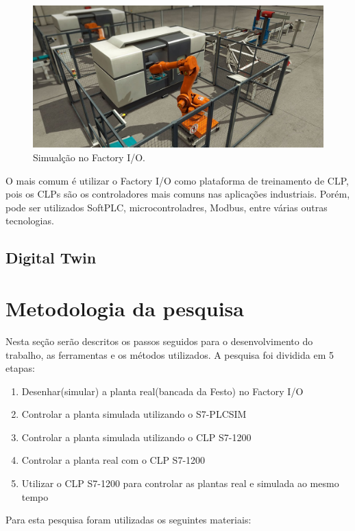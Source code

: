 \documentclass[a4paper, 12pt]{article}
\begin{document}
		\begin{figure}[H]
			\centering
			\includegraphics[scale=0.4]{figures/factory_io_1.jpg}
			\caption{Simualção no Factory I/O.}
			\label{fig:factory_simulation}
		\end{figure}
		
		O mais comum é utilizar o Factory I/O como plataforma de treinamento de CLP, pois
		os CLPs 	são os controladores mais comuns nas aplicações industriais. Porém, pode
		ser utilizados SoftPLC, microcontroladres, Modbus, entre várias outras tecnologias.
	
	\subsection{Digital Twin}

\section{Metodologia da pesquisa}
	
	Nesta seção serão descritos os passos seguidos para o desenvolvimento do trabalho,
	as ferramentas e os métodos utilizados.
	A pesquisa foi dividida em 5 etapas:
	\begin{enumerate}
		\item Desenhar(simular) a planta real(bancada da Festo) no Factory I/O
		\item Controlar a planta simulada utilizando o S7-PLCSIM
		\item Controlar a planta simulada utilizando o CLP S7-1200
		\item Controlar a planta real com o CLP S7-1200
		\item Utilizar o CLP S7-1200 para controlar as plantas real e simulada ao mesmo tempo
	\end{enumerate}

	
	Para esta pesquisa foram utilizadas os seguintes materiais:
		
\end{document}
